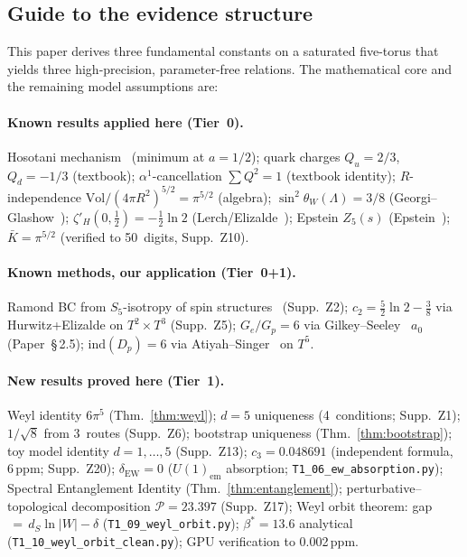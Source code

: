 \documentclass[11pt,a4paper]{article}
\theoremstyle{definition}
\theoremstyle{remark}
\begin{document}
\subsection*{Guide to the evidence structure}

This paper derives three fundamental constants on a saturated
five-torus that yields three high-precision, parameter-free relations.
The mathematical core and the remaining model assumptions are:

\paragraph{Known results applied here (Tier~0).}
Hosotani mechanism~\cite{Hosotani1983,Toms1983} (minimum at $a{=}1/2$);
quark charges $Q_u{=}2/3$, $Q_d{=}-1/3$ (textbook);
$\alpha^1$-cancellation $\sum Q^2=1$ (textbook identity);
$R$-independence $\mathrm{Vol}/(4\pi R^2)^{5/2}=\pi^{5/2}$ (algebra);
$\sin^2\theta_W(\Lambda)=3/8$ (Georgi--Glashow~\cite{GeorgiGlashow1974});
$\zeta'_H(0,\frac{1}{2})=-\frac{1}{2}\ln 2$ (Lerch/Elizalde~\cite{Elizalde1995});
Epstein $Z_5(s)$ (Epstein~\cite{Epstein1903});
$\bar K=\pi^{5/2}$ (verified to 50~digits, Supp.~Z10).

\paragraph{Known methods, our application (Tier~0+1).}
Ramond BC from $S_5$-isotropy of spin structures~\cite{LawsonMichelsohn1989} (Supp.~Z2);
$c_2=\frac{5}{2}\ln 2-\frac{3}{8}$ via Hurwitz+Elizalde on $T^2{\times}T^3$ (Supp.~Z5);
$G_e/G_p=6$ via Gilkey--Seeley~\cite{Gilkey1984} $a_0$ (Paper~\S\,2.5);
$\mathrm{ind}(D_p)=6$ via Atiyah--Singer~\cite{AtiyahSinger1968} on $T^5$.

\paragraph{New results proved here (Tier~1).}
Weyl identity $6\pi^5$ (Thm.~\ref{thm:weyl});
$d=5$ uniqueness (4~conditions; Supp.~Z1);
$1/\!\sqrt{8}$ from 3~routes (Supp.~Z6);
bootstrap uniqueness (Thm.~\ref{thm:bootstrap});
toy model identity $d=1,\ldots,5$ (Supp.~Z13);
$c_3=0.048691$ (independent formula, 6\,ppm; Supp.~Z20);
$\delta_{\mathrm{EW}}=0$ ($U(1)_{\mathrm{em}}$ absorption; \texttt{T1\_06\_ew\_absorption.py});
Spectral Entanglement Identity (Thm.~\ref{thm:entanglement});
perturbative--topological decomposition $\mathcal{P}=23.397$ (Supp.~Z17);
Weyl orbit theorem: gap$\,{=}\,d_S\ln|W|-\delta$ (\texttt{T1\_09\_weyl\_orbit.py});
$\beta^*=13.6$ analytical (\texttt{T1\_10\_weyl\_orbit\_clean.py});
GPU verification to 0.002\,ppm.
\end{document}
